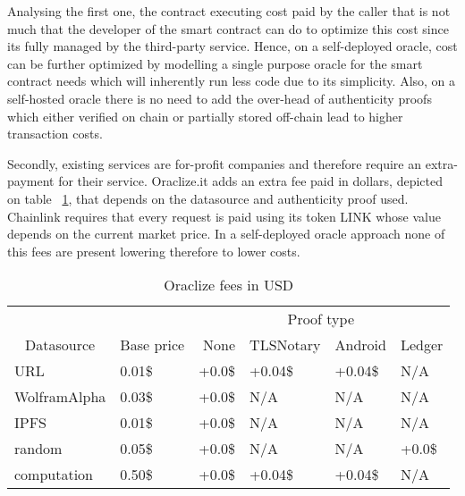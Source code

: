 Analysing the first one, the contract executing cost paid by the caller that is not much that the developer of the smart contract can do to optimize this cost since its fully managed by the third-party service. Hence, on a self-deployed oracle, cost can be further optimized by modelling a single purpose oracle for the smart contract needs which will inherently run less code due to its simplicity. Also, on a self-hosted oracle there is no need to add the over-head of authenticity proofs which either verified on chain or partially stored off-chain lead to higher transaction costs.

Secondly, existing services are for-profit companies and therefore require an extra-payment for their service. Oraclize.it adds an extra fee paid in dollars, depicted on table ~\ref{tab:oraclize-fees}, that depends on the datasource and authenticity proof used. Chainlink requires that every request is paid using its token LINK whose value depends on the current market price. In a self-deployed oracle approach none of this fees are present lowering therefore to lower costs.

\begin{table}
    \centering
    \begin{tabular}{@{}llllll@{}}
        \cmidrule(l){3-6}
                                       & \multicolumn{1}{l|}{}          & \multicolumn{4}{c|}{Proof type}                                                                                            \\ \cmidrule(r){1-2}
        \multicolumn{1}{c}{Datasource} & \multicolumn{1}{c}{Base price} & \multicolumn{1}{r}{None}        & \multicolumn{1}{r}{TLSNotary} & \multicolumn{1}{r}{Android} & \multicolumn{1}{r}{Ledger} \\ \midrule
        URL                            & 0.01\$                         & +0.0\$                          & +0.04\$                       & +0.04\$                     & N/A                        \\
        WolframAlpha                   & 0.03\$                         & +0.0\$                          & N/A                           & N/A                         & N/A                        \\
        IPFS                           & 0.01\$                         & +0.0\$                          & N/A                           & N/A                         & N/A                        \\
        random                         & 0.05\$                         & +0.0\$                          & N/A                           & N/A                         & +0.0\$                     \\
        computation                    & 0.50\$                         & +0.0\$                          & +0.04\$                       & +0.04\$                     & N/A                        \\ \bottomrule
    \end{tabular}
    \caption{Oraclize fees in USD}
    \label{tab:oraclize-fees}
\end{table}

